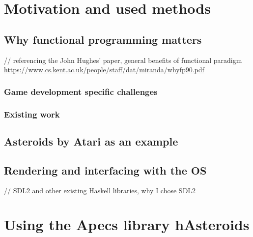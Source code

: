 \documentclass[
  digital, %
  table,   %
  twoside, %
  lof,     %
  lot,     %
]{fithesis3}
\begin{document}
\chapter{Motivation and used methods}

\section{Why functional programming matters}
// referencing the John Hughes' paper, general
benefits of functional paradigm \\
\url{https://www.cs.kent.ac.uk/people/staff/dat/miranda/whyfp90.pdf}

\subsection{Game development specific challenges}

\subsection{Existing work}

\section{Asteroids by Atari as an example}

\section{Rendering and interfacing with the OS}
// SDL2 and other existing Haskell libraries, why I chose SDL2


\chapter{Using the Apecs library \textemdash{} hAsteroids}
\end{document}
